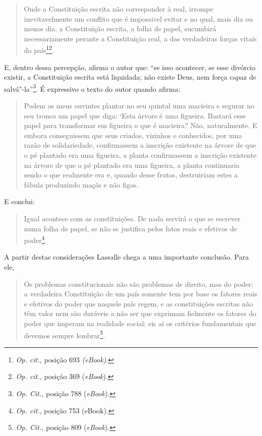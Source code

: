\begin{quote}
Onde a Constituição
escrita não corresponder à real, irrompe inevitavelmente um conflito que
é impossivel evitar e no qual, mais dia ou menos dia, a Constituição
escrita, a folha de papel, sucumbirá necessariamente perante a
Constituição real, a das verdadeiras forças vitais do país\footnote{\emph{Op.
  cit.,} posição 693 \emph{(eBook)}.}\footnote{\emph{Op. cit.,} %
   posição
  369 (\emph{eBook}).}.
\end{quote}

E, dentro dessa percepção, afirma o autor que:
``se isso acontecer, se esse divórcio existir, a Constituição
escrita está liquidada; não existe Deus, nem força capaz de
salvá"-la''\footnote{\emph{Op. Cit.,} posição 788 (\emph{eBook}).}. É
  expressivo o texto do autor quando afirma:

\begin{quote}
  Podem os meus
  ouvintes plantar no seu quintal uma macieira e segurar no seu tronco
  um papel que diga: `Esta árvore é uma figueira. Bastará esse papel
  para transformar em figueira o que é macieira? Não, naturalmente. E
  embora conseguissem que seus criados, vizinhos e conhecidos, por uma
  razão de solidariedade, confirmassem a inscrição existente na árvore
  de que o pé plantado era uma figueira, a planta confirmassem a
  inscrição existente na árvore de que o pé plantado era uma figueira, a
  planta continuaria sendo o que realmente era e, quando desse frutos,
  destruiriam estes a fábula produzindo maçãs e não figos.
\end{quote}

E conclui:

\begin{quote}
Igual acontece com as constituições. De nada servirá o que se
escrever numa folha de papel, se não se justifica pelos fatos reais e
efetivos de poder\footnote{\emph{Op. cit.}, posição 753 (eBook).}.
\end{quote}

A partir destas considerações Lassalle chega a uma importante conclusão.
Para ele,

\begin{quote}
Os problemas constitucionais não são problemas de
direito, mas do poder; a verdadeira Constituição de um país somente tem
por base os fatores reais e efetivos do poder que naquele país regem, e
as constituições escritas não têm valor nem são duráveis a não ser que
exprimam fielmente os fatores do poder que imperam na realidade social:
eis aí os critérios fundamentais que devemos sempre lembrar\footnote{\emph{Op.
  Cit.,} posição 809 (\emph{eBook}).}.
\end{quote}

